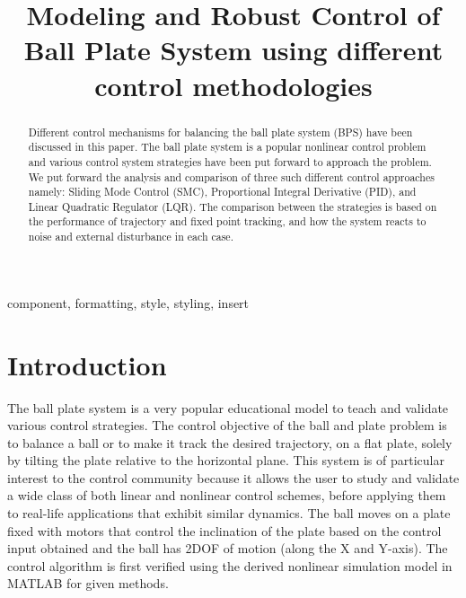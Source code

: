 \documentclass[conference]{IEEEtran}
\begin{document}
\title{Modeling and Robust Control of Ball Plate System using different control methodologies\\
}

\author{
\and
{}
}
\maketitle

\begin{abstract}
Different control mechanisms for balancing the ball plate system (BPS)  have been discussed in this paper. The ball plate system is a popular nonlinear control problem and various control system strategies have been put forward to approach the problem. We put forward the analysis and comparison of three such different control approaches namely: Sliding Mode Control (SMC), Proportional Integral Derivative (PID), and Linear Quadratic Regulator (LQR). The comparison between the strategies is based on the performance of trajectory and fixed point tracking, and how the system reacts to noise and external disturbance in each case.
\end{abstract}

\begin{IEEEkeywords}
component, formatting, style, styling, insert
\end{IEEEkeywords}

\section{Introduction}
The ball plate system is a very popular educational model to teach and validate various control strategies. The control objective of the ball and plate problem is to balance a ball or to make it track the desired trajectory, on a flat plate, solely by tilting the plate relative to the horizontal plane. This system is of particular interest to the control community because it allows the user to study and validate a wide class of both linear and nonlinear control schemes, before applying them to real-life applications that exhibit similar dynamics. The ball moves on a plate fixed with motors that control the inclination of the plate based on the control input obtained and the ball has 2DOF of motion (along the X and Y-axis). The control algorithm is first verified using the derived nonlinear simulation model in MATLAB for given methods.
\end{document}
